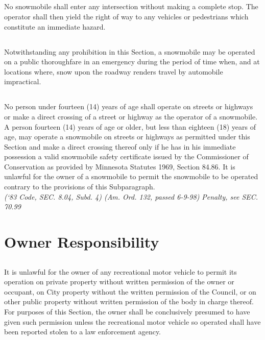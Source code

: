 \subsection{}
No snowmobile shall enter any intersection without making a complete stop. The operator shall then yield the right of way to any vehicles or pedestrians which constitute an immediate hazard.
\subsection{}
Notwithstanding any prohibition in this Section, a snowmobile may be operated on a public thoroughfare in an emergency during the period of time when, and at locations where, snow upon the roadway renders travel by automobile impractical.
\subsection{}
No person under fourteen (14) years of age shall operate on streets or highways or make a direct crossing of a street or highway as the operator of a snowmobile. A person fourteen (14) years of age or older, but less than eighteen (18) years of age, may operate a snowmobile on streets or highways as permitted under this Section and make a direct crossing thereof only if he has in his immediate possession a valid snowmobile safety certificate issued by the Commissioner of Conservation as provided by Minnesota Statutes 1969, Section 84.86. It is unlawful for the owner of a snowmobile to permit the snowmobile to be operated contrary to the provisions of this Subparagraph.\\
\emph{(‘83 Code, SEC. 8.04, Subd. 4) (Am. Ord. 132, passed 6-9-98)}
\emph{Penalty, see SEC. 70.99}

\section{Owner Responsibility}
\subsection{}
It is unlawful for the owner of any recreational motor vehicle to permit its operation on private property without written permission of the owner or occupant, on City property without the written permission of the Council, or on other public property without written permission of the body in charge thereof. For purposes of this Section, the owner shall be conclusively presumed to have given such permission unless the recreational motor vehicle so operated shall have been reported stolen to a law enforcement agency.
